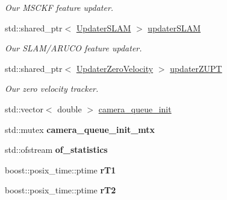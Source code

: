\begin{DoxyCompactItemize}
\begin{DoxyCompactList}\small\item\em Our M\+S\+C\+KF feature updater. \end{DoxyCompactList}\item 
\mbox{\label{classov__msckf_1_1VioManager_aeb2ad853d87a8f2b387db3cff18cdb0e}} 
std\+::shared\+\_\+ptr$<$ \hyperlink{classov__msckf_1_1UpdaterSLAM}{Updater\+S\+L\+AM} $>$ \hyperlink{classov__msckf_1_1VioManager_aeb2ad853d87a8f2b387db3cff18cdb0e}{updater\+S\+L\+AM}
\begin{DoxyCompactList}\small\item\em Our S\+L\+A\+M/\+A\+R\+U\+CO feature updater. \end{DoxyCompactList}\item 
\mbox{\label{classov__msckf_1_1VioManager_a94e1136ce9798ad776a19baceee5580c}} 
std\+::shared\+\_\+ptr$<$ \hyperlink{classov__msckf_1_1UpdaterZeroVelocity}{Updater\+Zero\+Velocity} $>$ \hyperlink{classov__msckf_1_1VioManager_a94e1136ce9798ad776a19baceee5580c}{updater\+Z\+U\+PT}
\begin{DoxyCompactList}\small\item\em Our zero velocity tracker. \end{DoxyCompactList}\item 
std\+::vector$<$ double $>$ \hyperlink{classov__msckf_1_1VioManager_a3d64db49753d6ae3ae946257c1a8e184}{camera\+\_\+queue\+\_\+init}
\item 
\mbox{\label{classov__msckf_1_1VioManager_a596b2a9f732e4c412d5c1e85d9b9eba3}} 
std\+::mutex {\bfseries camera\+\_\+queue\+\_\+init\+\_\+mtx}
\item 
\mbox{\label{classov__msckf_1_1VioManager_a2a945d55d74eeb81eb3a6ef1f774d0c9}} 
std\+::ofstream {\bfseries of\+\_\+statistics}
\item 
\mbox{\label{classov__msckf_1_1VioManager_aa25c347d35e5c3d0fab18c19179a95ea}} 
boost\+::posix\+\_\+time\+::ptime {\bfseries r\+T1}
\item 
\mbox{\label{classov__msckf_1_1VioManager_adc8f8ef4cfe2bc9ce3e45e398b3d7082}} 
boost\+::posix\+\_\+time\+::ptime {\bfseries r\+T2}

\end{DoxyCompactItemize}
